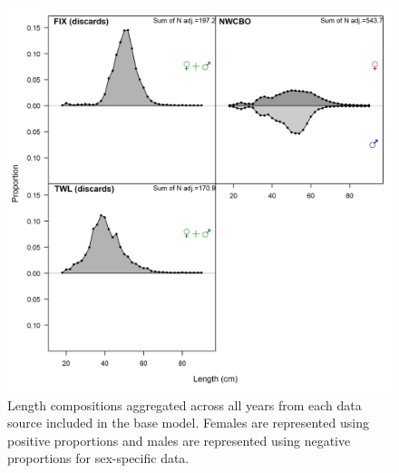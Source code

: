 \documentclass[11pt,
  english,
  a4paper,
]{article}
\begin{document}
\begin{figure}
\centering
\includegraphics[width=1\textwidth,height=1\textheight]{figs/comp_lendat__aggregated_across_time.png}
\caption{Length compositions aggregated across all years from each data source included in the base model. Females are represented using positive proportions and males are represented using negative proportions for sex-specific data.\label{lcaggregate}}
\end{figure}

\tagmcend\tagstructend

\end{document}
